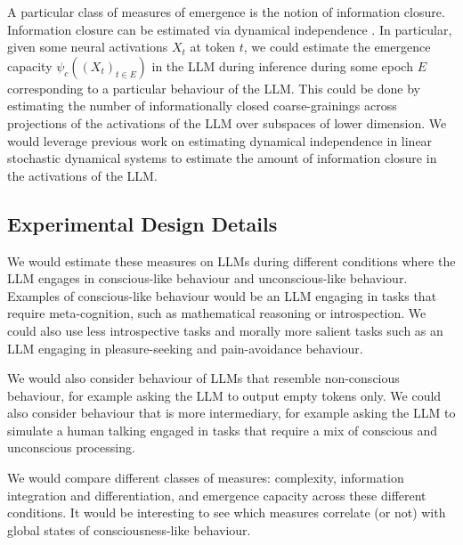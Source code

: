 \documentclass[11pt,a4paper]{article}
\begin{document}
A particular class of measures of emergence is the notion of information closure. Information closure can be estimated via dynamical independence \citep{Barnett2023}. In particular, given some neural activations $X_t$ at token $t$, we could estimate the emergence capacity $\psi_c((X_t)_{t\in E})$ in the LLM during inference during some epoch $E$ corresponding to a particular behaviour of the LLM. This could be done by estimating the number of informationally closed coarse-grainings across projections of the activations of the LLM over subspaces of lower dimension. We would leverage previous work on estimating dynamical independence in linear stochastic dynamical systems to estimate the amount of information closure in the activations of the LLM.

\subsection{Experimental Design Details}

We would estimate these measures on LLMs during different conditions where the LLM engages in conscious-like behaviour and unconscious-like behaviour. Examples of conscious-like behaviour would be an LLM engaging in tasks that require meta-cognition, such as mathematical reasoning or introspection. We could also use less introspective tasks and morally more salient tasks such as an LLM engaging in pleasure-seeking and pain-avoidance behaviour.

We would also consider behaviour of LLMs that resemble non-conscious behaviour, for example asking the LLM to output empty tokens only. We could also consider behaviour that is more intermediary, for example asking the LLM to simulate a human talking engaged in tasks that require a mix of conscious and unconscious processing.

We would compare different classes of measures: complexity, information integration and differentiation, and emergence capacity across these different conditions. It would be interesting to see which measures correlate (or not) with global states of consciousness-like behaviour.

\end{document}
